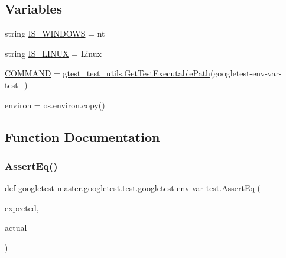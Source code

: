 \subsection*{Variables}
\begin{DoxyCompactItemize}
\item 
string \mbox{\hyperlink{namespacegoogletest-master_1_1googletest_1_1test_1_1googletest-env-var-test_aff41eec48474456298e9f3a814cbe4ee}{I\+S\+\_\+\+W\+I\+N\+D\+O\+WS}} = \textquotesingle{}nt\textquotesingle{}
\item 
string \mbox{\hyperlink{namespacegoogletest-master_1_1googletest_1_1test_1_1googletest-env-var-test_a0956f3b01ed0aba69b372fb72407a097}{I\+S\+\_\+\+L\+I\+N\+UX}} = \textquotesingle{}Linux\textquotesingle{}
\item 
\mbox{\hyperlink{namespacegoogletest-master_1_1googletest_1_1test_1_1googletest-env-var-test_aa645736cb838d6559e6e5de6367db398}{C\+O\+M\+M\+A\+ND}} = \mbox{\hyperlink{namespacegoogletest-master_1_1googletest_1_1test_1_1gtest__test__utils_a78bbc69ac699e750a6a29188caa643c4}{gtest\+\_\+test\+\_\+utils.\+Get\+Test\+Executable\+Path}}(\textquotesingle{}googletest-\/env-\/var-\/test\+\_\+\textquotesingle{})
\item 
\mbox{\hyperlink{namespacegoogletest-master_1_1googletest_1_1test_1_1googletest-env-var-test_a8baf776191353c08f951bfd45503a61c}{environ}} = os.\+environ.\+copy()
\end{DoxyCompactItemize}


\subsection{Function Documentation}
\mbox{\label{namespacegoogletest-master_1_1googletest_1_1test_1_1googletest-env-var-test_a88fd4580c525aa618208816f96b531e6}} 
\subsubsection{\texorpdfstring{AssertEq()}{AssertEq()}}
{\footnotesize\ttfamily def googletest-\/master.\+googletest.\+test.\+googletest-\/env-\/var-\/test.\+Assert\+Eq (\begin{DoxyParamCaption}\item[{}]{expected,  }\item[{}]{actual }\end{DoxyParamCaption})}

